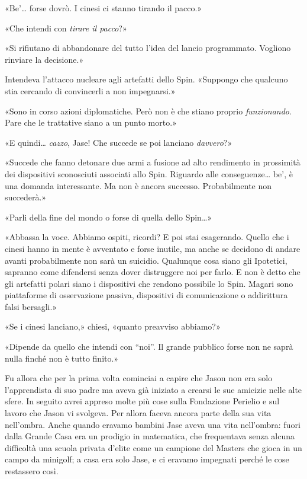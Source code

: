 «Be'\ldots{} forse dovrò. I cinesi ci stanno tirando il pacco.»

«Che intendi con \emph{tirare il pacco}?»

«Si rifiutano di abbandonare del tutto l'idea del lancio programmato.
Vogliono rinviare la decisione.»

Intendeva l'attacco nucleare agli artefatti dello Spin. «Suppongo che
qualcuno stia cercando di convincerli a non impegnarsi.»

«Sono in corso azioni diplomatiche. Però non è che stiano proprio
\emph{funzionando}. Pare che le trattative siano a un punto morto.»

«E quindi\ldots{} \emph{cazzo}, Jase! Che succede se poi lanciano
\emph{davvero}?»

«Succede che fanno detonare due armi a fusione ad alto rendimento in
prossimità dei dispositivi sconosciuti associati allo Spin. Riguardo
alle conseguenze\ldots{} be', è una domanda interessante. Ma non è
ancora successo. Probabilmente non succederà.»

«Parli della fine del mondo o forse di quella dello Spin\ldots»

«Abbassa la voce. Abbiamo ospiti, ricordi? E poi stai esagerando. Quello
che i cinesi hanno in mente è avventato e forse inutile, ma anche se
decidono di andare avanti probabilmente non sarà un suicidio. Qualunque
cosa siano gli Ipotetici, sapranno come difendersi senza dover
distruggere noi per farlo. E non è detto che gli artefatti polari siano
i dispositivi che rendono possibile lo Spin. Magari sono piattaforme di
osservazione passiva, dispositivi di comunicazione o addirittura falsi
bersagli.»

«Se i cinesi lanciano,» chiesi, «quanto preavviso abbiamo?»

«Dipende da quello che intendi con ``noi''. Il grande pubblico forse non
ne saprà nulla finché non è tutto finito.»

Fu allora che per la prima volta cominciai a capire che Jason non era
solo l'apprendista di suo padre ma aveva già iniziato a crearsi le sue
amicizie nelle alte sfere. In seguito avrei appreso molte più cose sulla
Fondazione Perielio e sul lavoro che Jason vi svolgeva. Per allora
faceva ancora parte della sua vita nell'ombra. Anche quando eravamo
bambini Jase aveva una vita nell'ombra: fuori dalla Grande Casa era un
prodigio in matematica, che frequentava senza alcuna difficoltà una
scuola privata d'elite come un campione del Masters che gioca in un
campo da minigolf; a casa era solo Jase, e ci eravamo impegnati perché
le cose restassero così.

